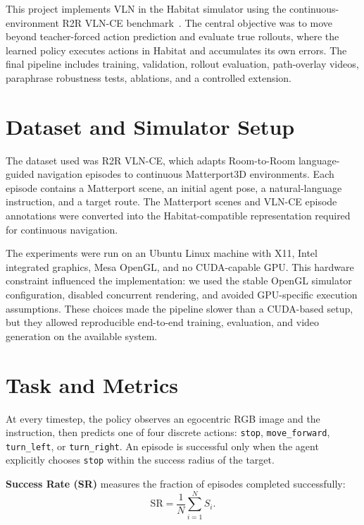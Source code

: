 This project implements VLN in the Habitat simulator using the continuous-environment R2R VLN-CE benchmark~\cite{anderson2018r2r,krantz2020vlnce}. The central objective was to move beyond teacher-forced action prediction and evaluate true rollouts, where the learned policy executes actions in Habitat and accumulates its own errors. The final pipeline includes training, validation, rollout evaluation, path-overlay videos, paraphrase robustness tests, ablations, and a controlled extension.

\section{Dataset and Simulator Setup}

The dataset used was R2R VLN-CE, which adapts Room-to-Room language-guided navigation episodes to continuous Matterport3D environments. Each episode contains a Matterport scene, an initial agent pose, a natural-language instruction, and a target route. The Matterport scenes and VLN-CE episode annotations were converted into the Habitat-compatible representation required for continuous navigation.

The experiments were run on an Ubuntu Linux machine with X11, Intel integrated graphics, Mesa OpenGL, and no CUDA-capable GPU. This hardware constraint influenced the implementation: we used the stable OpenGL simulator configuration, disabled concurrent rendering, and avoided GPU-specific execution assumptions. These choices made the pipeline slower than a CUDA-based setup, but they allowed reproducible end-to-end training, evaluation, and video generation on the available system.

\section{Task and Metrics}

At every timestep, the policy observes an egocentric RGB image and the instruction, then predicts one of four discrete actions: \texttt{stop}, \texttt{move\_forward}, \texttt{turn\_left}, or \texttt{turn\_right}. An episode is successful only when the agent explicitly chooses \texttt{stop} within the success radius of the target.

\textbf{Success Rate (SR)} measures the fraction of episodes completed successfully:
\begin{equation}
    \mathrm{SR} = \frac{1}{N}\sum_{i=1}^N S_i .
\end{equation}

